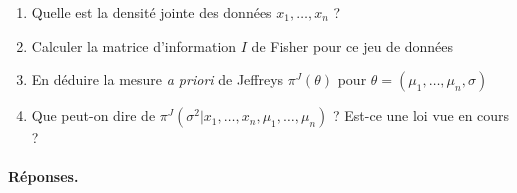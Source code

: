 \begin{enumerate}
\item Quelle est la densité jointe des données $x_1,\ldots,x_n$ ?
\item Calculer la matrice d'information $I$ de Fisher pour ce jeu de données
\item En déduire la mesure {\it a priori} de Jeffreys $\pi^J(\theta)$ pour $\theta=(\mu_1,\ldots,\mu_n,\sigma)$
\item Que peut-on dire de $\pi^J(\sigma^2|x_1,\ldots,x_n,\mu_1,\ldots,\mu_n)$ ? Est-ce une loi vue en cours ? 
\end{enumerate}

\paragraph{\bf Réponses.}
